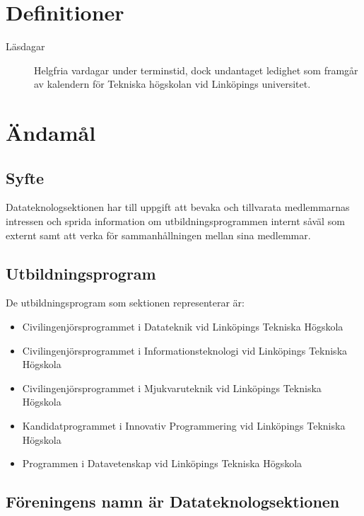 \documentclass{datateknologsektionen-document}
\begin{document}
  \tableofcontents

  \pagebreak

  \section*{Definitioner}
  \begin{description}  
    \item [Läsdagar]
    Helgfria vardagar under terminstid, dock undantaget ledighet som
    framgår av kalendern för Tekniska högskolan vid Linköpings universitet. 
  \end{description}

  \section{Ändamål}
    \subsection{Syfte}
      \label{syfte}
      Datateknologsektionen har till uppgift att bevaka och tillvarata medlemmarnas intressen
      och sprida information om utbildningsprogrammen internt såväl som externt samt att
      verka för sammanhållningen mellan sina medlemmar.
    \subsection{Utbildningsprogram}
      \label{utbildningsprogram}
      De utbildningsprogram som sektionen representerar är:
      \begin{itemize}
        \item Civilingenjörsprogrammet i Datateknik vid Linköpings Tekniska Högskola
        \item Civilingenjörsprogrammet i Informationsteknologi vid Linköpings Tekniska Högskola
        \item Civilingenjörsprogrammet i Mjukvaruteknik vid Linköpings Tekniska Högskola
        \item Kandidatprogrammet i Innovativ Programmering vid Linköpings Tekniska Högskola
        \item Programmen i Datavetenskap vid Linköpings Tekniska Högskola
      \end{itemize}
      
    \subsection{Föreningens namn är Datateknologsektionen}
\end{document}
